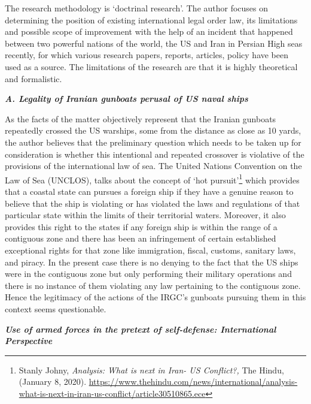 \begin{multicols}{2}
\noi
The research methodology is ‘doctrinal research’. The author focuses on determining the
position of existing international legal order law, its limitations and possible scope of
improvement with the help of an incident that happened between two powerful nations of
the world, the US and Iran in Persian High seas recently, for which various research papers,
reports, articles, policy have been used as a source. The limitations of the research are that it
is highly theoretical and formalistic.


\textbf{\textit{A. Legality of Iranian gunboats perusal of US naval ships}}

\noi
As the facts of the matter objectively represent that the Iranian gunboats repeatedly crossed
the US warships, some from the distance as close as 10 yards, the author believes that the
preliminary question which needs to be taken up for consideration is whether this intentional
and repeated crossover is violative of the provisions of the international law of sea. The
United Nations Convention on the Law of Sea (UNCLOS), talks about the concept of ‘hot
pursuit’\footnote{Stanly Johny, \textit{Analysis: What is next in Iran- US Conflict?,} The Hindu, (January 8, 2020).
\url{https://www.thehindu.com/news/international/analysis-what-is-next-in-iran-us-conflict/article30510865.ece}}  which provides that a coastal state can pursues a foreign ship if they have a
genuine reason to believe that the ship is violating or has violated the laws and regulations
of that particular state within the limits of their territorial waters. Moreover, it also provides
this right to the states if any foreign ship is within the range of a contiguous zone and there
has been an infringement of certain established exceptional rights for that zone like
immigration, fiscal, customs, sanitary laws, and piracy. In the present case there is no
denying to the fact that the US ships were in the contiguous zone but only performing their
military operations and there is no instance of them violating any law pertaining to the
contiguous zone. Hence the legitimacy of the actions of the IRGC’s gunboats pursuing them
in this context seems questionable.

\noi
\textbf{\textit{Use of armed forces in the pretext of self-defense: International Perspective}}


\end{multicols}

